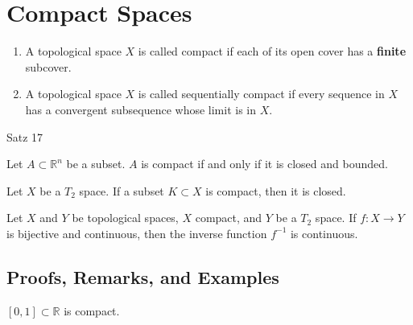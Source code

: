 \chapter{Compact Spaces}
\begin{defbox}
    \begin{definition}
        \begin{enumerate}
            \item A {\color{mathobj}topological space} \(X\) is called {\color{maththen}compact} if each of its {\color{mathif}open cover} has a \textbf{finite} {\color{mathif}subcover}.
            \item A {\color{mathobj}topological space} \(X\) is called {\color{maththen}sequentially compact} if every {\color{mathif}sequence} in \(X\) has a {\color{mathif}convergent subsequence} whose limit is in \(X\).
        \end{enumerate}
    \end{definition}
\end{defbox}
%
\begin{thmbox}
    \begin{theorem}
        Satz 17
    \end{theorem}
\end{thmbox}
%
\begin{thmbox}
    \begin{theorem}
        Let \(A \subset \mathbb{R}^n\) be a subset. \(A\) is compact if and only if it is closed and bounded.
    \end{theorem}
\end{thmbox}
%
\begin{thmbox}
    \begin{theorem}
        Let \(X\) be a \(T_2\) space. If a subset \(K \subset X\) is compact, then it is closed.
    \end{theorem}
\end{thmbox}
%
\begin{thmbox}
    \begin{theorem}
        Let \(X\) and \(Y\) be topological spaces, \(X\) compact, and \(Y\) be a \(T_2\) space. If \(f: X \longrightarrow Y\) is bijective and continuous, then the inverse function \(f^{-1}\) is continuous.
    \end{theorem}
\end{thmbox}
%
\newpage
\section{Proofs, Remarks, and Examples}

\begin{thmbox}
    \begin{lemma}
        \([0, 1] \subset \mathbb{R}\) is {\color{maththen}compact}.
    \end{lemma}
\end{thmbox}